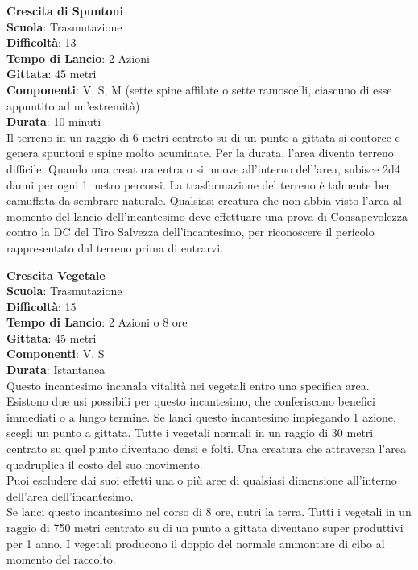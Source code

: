 \begin{multicols}{2}
\medskip\textbf{Crescita di Spuntoni}\\
\textbf{Scuola}: Trasmutazione\\
\textbf{Difficoltà}: 13\\
\textbf{Tempo di Lancio}: 2 Azioni\\
\textbf{Gittata}: 45 metri\\
\textbf{Componenti}: V, S, M (sette spine affilate o sette ramoscelli, ciascuno di esse appuntito ad un'estremità)\\
\textbf{Durata}: 10 minuti\\
Il terreno in un raggio di 6 metri centrato su di un punto a gittata si contorce e genera spuntoni e spine molto acuminate. Per la durata, l'area diventa terreno difficile. Quando una creatura entra o si muove all'interno dell'area, subisce 2d4 danni per ogni 1 metro percorsi.
La trasformazione del terreno è talmente ben camuffata da sembrare naturale. Qualsiasi creatura che non abbia visto l'area al momento del lancio dell'incantesimo deve effettuare una prova di Consapevolezza contro la DC del Tiro Salvezza dell'incantesimo, per riconoscere il pericolo rappresentato dal terreno prima di entrarvi. 

\medskip\textbf{Crescita Vegetale}\\
\textbf{Scuola}: Trasmutazione\\
\textbf{Difficoltà}: 15\\
\textbf{Tempo di Lancio}: 2 Azioni o 8 ore\\
\textbf{Gittata}: 45 metri\\
\textbf{Componenti}: V, S\\
\textbf{Durata}: Istantanea\\
Questo incantesimo incanala vitalità nei vegetali entro una specifica area. Esistono due usi possibili per questo incantesimo, che conferiscono benefici immediati o a lungo termine. Se lanci questo incantesimo impiegando 1 azione, scegli un punto a gittata. Tutte i vegetali normali in un raggio di 30 metri centrato su quel punto diventano densi e folti. Una creatura che attraversa l'area quadruplica il costo del suo movimento.\\
Puoi escludere dai suoi effetti una o più aree di qualsiasi dimensione all'interno dell'area dell'incantesimo.\\
Se lanci questo incantesimo nel corso di 8 ore, nutri la terra. Tutti i vegetali in un raggio di 750 metri centrato su di un punto a gittata diventano super produttivi per 1 anno. I vegetali producono il doppio del normale ammontare di cibo al momento del raccolto.


\end{multicols}
